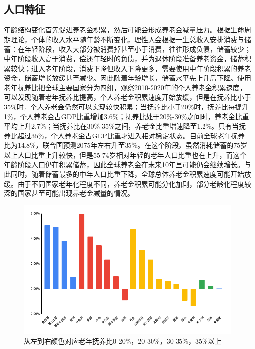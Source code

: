 \documentclass[a4paper,zihao=5]{ctexart}
\begin{document}
\subsection{人口特征}
年龄结构变化首先促进养老金积累，然后可能会形成养老金减量压力。根据生命周期理论\cite{ando1963life}，个体的收入水平随年龄不断变化，理性人会根据一生总收入安排消费与储蓄：在年轻阶段，收入大部分被消费掉甚至小于消费，往往形成负债，储蓄较少；中年阶段收入高于消费，偿还年轻时的负债，并为退休阶段准备养老资金，储蓄积累较快；进入老年阶段，消费下降但收入下降更多，需要使用中年阶段积累的养老资金，储蓄增长放缓甚至减少。因此随着年龄增长，储蓄水平先上升后下降。使用老年抚养比把全球主要国家分为四组，观察2010-2020年的个人养老金积累速度，可以发现随着老年抚养比提高，个人养老金积累速度开始放缓，但是在抚养比小于35\%时，个人养老金仍然可以实现较快积累；当抚养比小于20\%时，抚养比每提升1\%，个人养老金占GDP比重增加3.6\%；抚养比处于20\%-30\%之间时，养老金比重平均上升2.7\%；当抚养比在30\%-35\%之间，养老金比重增速降至1.2\%。只有当抚养比超过35\%，个人养老金占GDP比重才进入相对稳定状态。目前全球老年抚养比为14.8\%，联合国预测2075年左右升至35\%。在这个阶段，虽然消耗储蓄的75岁以上人口比重上升较快，但是55-74岁相对年轻的老年人口比重也在上升，而这个年龄阶段人口仍在积累储蓄，因此全球养老金在未来10年里可能仍会继续增长。与此同时，随着储蓄最多的中年人口比重下降，全球总体养老金积累速度可能开始放缓。由于不同国家老年化程度不同，养老金积累可能分化加剧，部分老龄化程度较深的国家甚至可能出现养老金减量的情况。
\begin{figure}[H]
    \centering
    \includegraphics[width=\linewidth]{img/随着老年付养比提高，养老金积累增速开始下降.png}
    \caption{从左到右颜色对应老年抚养比0-20\%，20-30\%，30-35\%，35\%以上}
\end{figure}
\end{document}
